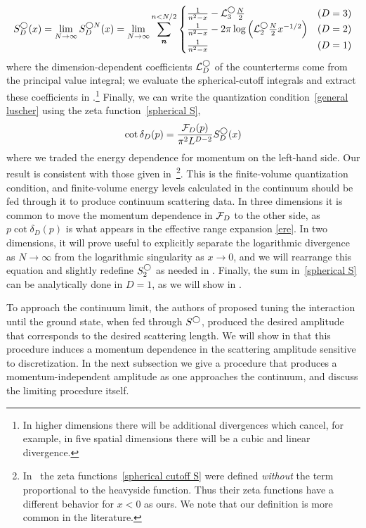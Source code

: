 \begin{equation}\label{eq:spherical S}
    S^\bigcirc_D(x)
    =
    \lim_{N\rightarrow\infty} S^{\bigcirc N}_D(x)
    =
    \lim_{N\rightarrow\infty} \sum_{\boldsymbol{n}}^{n < N/2}
    \begin{cases}
     \frac{1}{n^2-x} - \mathcal{L}_3^\bigcirc \frac{N}{2}& (D=3)\\
     \frac{1}{n^2-x} - 2\pi\log\left(\mathcal{L}_2^\bigcirc\frac{N}{2}x^{-1/2}\right)& (D=2)\\
    \frac{1}{n^2-x} & (D=1)
     \end{cases}
\end{equation}
where the dimension-dependent coefficients $\mathcal{L}_D^\bigcirc$ of the counterterms come from the principal value integral; we evaluate the spherical-cutoff integrals and extract these coefficients in .\footnote{In higher dimensions there will be additional divergences which cancel, for example, in five spatial dimensions there will be a cubic and linear divergence.
}
Finally, we can write the quantization condition~\eqref{general luscher} using the zeta function~\eqref{spherical S},
\begin{equation}\label{eq:spherical quantization}
    \cot \delta_{D}(p) = \frac{\mathcal{F}_{D}(p)}{\pi^2 L^{D-2}} S^\bigcirc_D(x)
\end{equation}
where we traded the energy dependence for momentum on the left-hand side.  Our result is consistent with those given in~\footnote{In~ the zeta functions~\eqref{spherical cutoff S} were defined \emph{without} the term proportional to the heavyside function.  Thus their zeta functions have a different behavior for $x<0$ as ours.  We note that our definition is more common in the literature.}.
This is the \Luscher finite-volume quantization condition, and finite-volume energy levels calculated in the continuum should be fed through it to produce continuum scattering data.
In three dimensions it is common to move the momentum dependence in $\mathcal{F}_{D}$ to the other side, as $p \cot\delta_{D}(p)$ is what appears in the effective range expansion \eqref{ere}.
In two dimensions, it will prove useful to explicitly separate the logarithmic divergence as $N\to\infty$ from the logarithmic singularity as $x\to 0$, and we will rearrange this equation and slightly redefine $S^\bigcirc_2$ as needed in .  Finally, the sum in~\eqref{spherical S} can be analytically done in $D=1$, as we will show in .


To approach the continuum limit, the authors of  proposed tuning the interaction until the ground state, when fed through $S^\bigcirc$, produced the desired amplitude that corresponds to the desired scattering length.
We will show in  that this procedure induces a momentum dependence in the scattering amplitude sensitive to discretization.
In the next subsection we give a procedure that produces a momentum-independent amplitude as one approaches the continuum, and discuss the limiting procedure itself.
